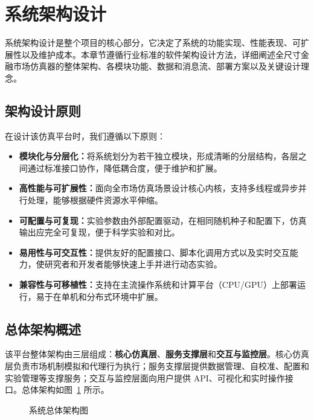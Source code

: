 \section{系统架构设计}

系统架构设计是整个项目的核心部分，它决定了系统的功能实现、性能表现、可扩展性以及维护成本。本章节遵循行业标准的软件架构设计方法，详细阐述全尺寸金融市场仿真器的整体架构、各模块功能、数据和消息流、部署方案以及关键设计理念。

\subsection{架构设计原则}

在设计该仿真平台时，我们遵循以下原则：

\begin{itemize}
  \item \textbf{模块化与分层化：}将系统划分为若干独立模块，形成清晰的分层结构，各层之间通过标准接口协作，降低耦合度，便于维护和扩展。
  \item \textbf{高性能与可扩展性：}面向全市场仿真场景设计核心内核，支持多线程或异步并行处理，能够根据硬件资源水平伸缩。
  \item \textbf{可配置与可复现：}实验参数由外部配置驱动，在相同随机种子和配置下，仿真输出应完全可复现，便于科学实验和对比。
  \item \textbf{易用性与可交互性：}提供友好的配置接口、脚本化调用方式以及实时交互能力，使研究者和开发者能够快速上手并进行动态实验。
  \item \textbf{兼容性与可移植性：}支持在主流操作系统和计算平台（CPU/GPU）上部署运行，易于在单机和分布式环境中扩展。
\end{itemize}

\subsection{总体架构概述}

该平台整体架构由三层组成：\textbf{核心仿真层}、\textbf{服务支撑层}和\textbf{交互与监控层}。核心仿真层负责市场机制模拟和代理行为执行；服务支撑层提供数据管理、自校准、配置和实验管理等支撑服务；交互与监控层面向用户提供 API、可视化和实时操作接口。总体架构如图~\ref{fig:architecture_overview} 所示。

\begin{figure}[htbp]
  \centering
  \resizebox{\linewidth}{!}{}
  \caption{系统总体架构图}
  \label{fig:architecture_overview}
\end{figure}

